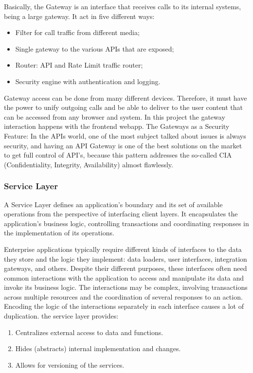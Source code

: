 Basically, the Gateway is an interface that receives calls to its internal systems, being a large gateway. It act in five different ways:

\begin{itemize}
\item Filter for call traffic from different media;
\item Single gateway to the various APIs that are exposed;
\item Router: API and Rate Limit traffic router;
\item Security engine with authentication and logging.
\end{itemize}

Gateway access can be done from many different devices. Therefore, it must have the power to unify outgoing calls and be able to deliver to the user content that can be accessed from any browser and system. In this project the gateway interaction happens with the frontend webapp. The Gateways as a Security Feature: In the APIs world, one of the most subject talked about issues is always security, and having an API Gateway is one of the best solutions on the market to get full control of API’s, because this pattern addresses the so-called CIA (Confidentiality, Integrity, Availability) almost flawlessly.

\subsubsection{Service Layer}\label{sec:ServiceLayer}
A Service Layer defines an application's boundary and its set of available operations from the perspective of interfacing client layers. It encapsulates the application's business logic, controlling transactions and coordinating responses in the implementation of its operations.

Enterprise applications typically require different kinds of interfaces to the data they store and the logic they implement: data loaders, user interfaces, integration gateways, and others. Despite their different purposes, these interfaces often need common interactions with the application to access and manipulate its data and invoke its business logic. The interactions may be complex, involving transactions across multiple resources and the coordination of several responses to an action. Encoding the logic of the interactions separately in each interface causes a lot of duplication. the service layer provides:

\begin{enumerate}
\item Centralizes external access to data and functions.
\item Hides (abstracts) internal implementation and changes.
\item Allows for versioning of the services.
\end{enumerate}

